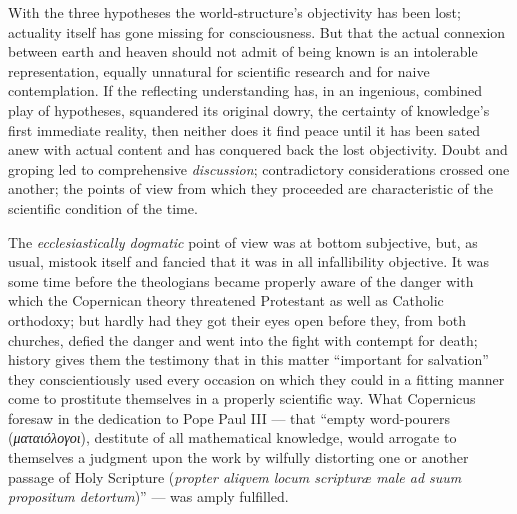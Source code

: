 \documentclass[12pt,a4paper]{book}
\begin{document}
With the three hypotheses the world-structure's objectivity has been lost; actuality itself has gone missing
for consciousness. But that the actual connexion between earth and heaven should not admit of being known is
an intolerable representation, equally unnatural for scientific research and for naive contemplation. If the
reflecting understanding has, in an ingenious, combined play of hypotheses, squandered its original dowry,
the certainty of knowledge's first immediate reality, then neither does it find peace until it has been
sated anew with actual content and has conquered back the lost objectivity. Doubt and groping led to
comprehensive \emph{discussion}; contradictory considerations crossed one another; the points of view from
which they proceeded are characteristic of the scientific condition of the time.

The \emph{ecclesiastically dogmatic} point of view was at bottom subjective, but, as usual, mistook itself
and fancied that it was in all infallibility objective. It was some time before the theologians became
properly aware of the danger with which the Copernican theory threatened Protestant as well as Catholic
orthodoxy; but hardly had they got their eyes open before they, from both churches, defied the danger and
went into the fight with contempt for death; history gives them the testimony that in this matter
``important for salvation'' they conscientiously used every occasion on which they could in a fitting manner
come to prostitute themselves in a properly scientific way.
What Copernicus foresaw in the dedication to Pope Paul III --- that ``empty word-pourers
(\textit{ματαιόλογοι}), destitute of all mathematical knowledge, would arrogate to themselves a judgment
upon the work by wilfully distorting one or another passage of Holy
Scripture (\textit{propter aliqvem locum scripturæ male ad suum propositum detortum})'' --- was amply
fulfilled.
\end{document}
